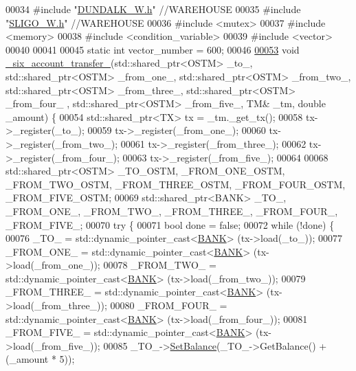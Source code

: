 \begin{DoxyCode}
00034 \textcolor{preprocessor}{#include "\hyperlink{_d_u_n_d_a_l_k___w_8h}{DUNDALK\_W.h}"}   \textcolor{comment}{//WAREHOUSE}
00035 \textcolor{preprocessor}{#include "\hyperlink{_s_l_i_g_o___w_8h}{SLIGO\_W.h}"}     \textcolor{comment}{//WAREHOUSE}
00036 \textcolor{preprocessor}{#include <mutex>}
00037 \textcolor{preprocessor}{#include <memory>}
00038 \textcolor{preprocessor}{#include <condition\_variable>}
00039 \textcolor{preprocessor}{#include <vector>}
00040 
00041 
00045 \textcolor{keyword}{static} \textcolor{keywordtype}{int} vector\_number = 600;
00046 
\hypertarget{main_8cpp_source.tex_l00053}{}\hyperlink{main_8cpp_a944b67b9489cc68c8eac66d42f4515ec}{00053} \textcolor{keywordtype}{void} \hyperlink{main_8cpp_a944b67b9489cc68c8eac66d42f4515ec}{\_six\_account\_transfer\_}(std::shared\_ptr<OSTM> \_to\_, std::shared\_ptr<OSTM> 
      \_from\_one\_, std::shared\_ptr<OSTM> \_from\_two\_, std::shared\_ptr<OSTM> \_from\_three\_, std::shared\_ptr<OSTM> \_from\_four\_
      , std::shared\_ptr<OSTM> \_from\_five\_, TM& \_tm, \textcolor{keywordtype}{double} \_amount) \{
00054     std::shared\_ptr<TX> tx = \_tm.\_get\_tx();
00058     tx->\_register(\_to\_);
00059     tx->\_register(\_from\_one\_);
00060     tx->\_register(\_from\_two\_);
00061     tx->\_register(\_from\_three\_);
00062     tx->\_register(\_from\_four\_);
00063     tx->\_register(\_from\_five\_);
00064 
00068     std::shared\_ptr<OSTM> \_TO\_OSTM, \_FROM\_ONE\_OSTM, \_FROM\_TWO\_OSTM, \_FROM\_THREE\_OSTM, \_FROM\_FOUR\_OSTM, 
      \_FROM\_FIVE\_OSTM;
00069     std::shared\_ptr<BANK> \_TO\_, \_FROM\_ONE\_, \_FROM\_TWO\_, \_FROM\_THREE\_, \_FROM\_FOUR\_, \_FROM\_FIVE\_;
00070     \textcolor{keywordflow}{try} \{
00071         \textcolor{keywordtype}{bool} done = \textcolor{keyword}{false};
00072         \textcolor{keywordflow}{while} (!done) \{
00076             \_TO\_ = std::dynamic\_pointer\_cast<\hyperlink{class_b_a_n_k}{BANK}> (tx->load(\_to\_));
00077             \_FROM\_ONE\_ = std::dynamic\_pointer\_cast<\hyperlink{class_b_a_n_k}{BANK}> (tx->load(\_from\_one\_));
00078             \_FROM\_TWO\_ = std::dynamic\_pointer\_cast<\hyperlink{class_b_a_n_k}{BANK}> (tx->load(\_from\_two\_));
00079             \_FROM\_THREE\_ = std::dynamic\_pointer\_cast<\hyperlink{class_b_a_n_k}{BANK}> (tx->load(\_from\_three\_));
00080             \_FROM\_FOUR\_ = std::dynamic\_pointer\_cast<\hyperlink{class_b_a_n_k}{BANK}> (tx->load(\_from\_four\_));
00081             \_FROM\_FIVE\_ = std::dynamic\_pointer\_cast<\hyperlink{class_b_a_n_k}{BANK}> (tx->load(\_from\_five\_));
00085             \_TO\_->\hyperlink{class_b_a_n_k_a43bef9f486c88a2dc4906eee0e38a394}{SetBalance}(\_TO\_->GetBalance() + (\_amount * 5));

\end{DoxyCode}
